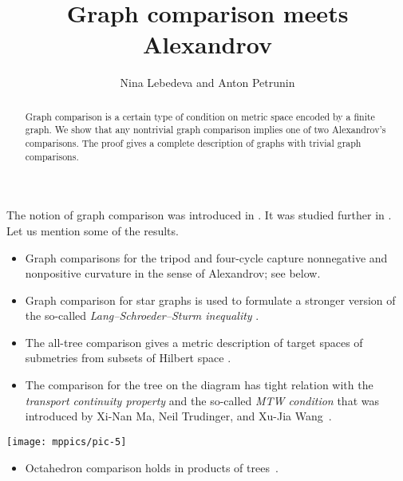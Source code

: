 \documentclass{article}
\def\thetitle{Graph comparison meets Alexandrov}
\def\theauthors{Nina Lebedeva and Anton Petrunin}
\begin{document}


\title{\thetitle}
\author{\theauthors}

\date{}
\maketitle
\begin{abstract}
Graph comparison is a certain type of condition on metric space encoded by a finite graph.
We show that any nontrivial graph comparison implies one of two Alexandrov's comparisons.
The proof gives a complete description of graphs with trivial graph comparisons.
\end{abstract}

The notion of graph comparison was introduced in \cite{lebedeva-petrunin-zolotov}.
It was studied further in \cite{toyoda,toyoda2019,lebedeva-petrunin-CBB,lebedeva,lebedeva-petrunin,lebedeva-petrunin-octahedron}.
Let us mention some of the results.
\begin{itemize}
\item Graph comparisons for the tripod and four-cycle capture nonnegative and nonpositive curvature in the sense of Alexandrov; see below.
\end{itemize}
\begin{itemize}
\item Graph comparison for star graphs is used to formulate a stronger version of the so-called \emph{Lang--Schroeder--Sturm inequality} \cite{lang-schroeder, sturm, lebedeva-petrunin-CBB}.
\end{itemize}
\begin{itemize}
\item The all-tree comparison gives a metric description of target spaces of submetries from subsets of Hilbert space \cite{lebedeva-petrunin-zolotov}.
\end{itemize}

\noindent
\begin{minipage}
{.80\textwidth}
\begin{itemize}
\item The comparison for the tree on the diagram has tight relation with the \emph{transport continuity property} and the so-called \emph{MTW condition} that was introduced by Xi-Nan Ma, Neil Trudinger, and Xu-Jia Wang~\cite{lebedeva-petrunin-zolotov,ma-trudinger-wang}.
\end{itemize}
\end{minipage}
\hfill
\begin{minipage}{.17\textwidth}
\centering
\vskip-1mm
\texttt{[image: mppics/pic-5]}
\end{minipage}
\begin{itemize}
\item Octahedron comparison holds in products of trees~\cite{lebedeva-petrunin-octahedron}.
\end{itemize}
\end{document}
